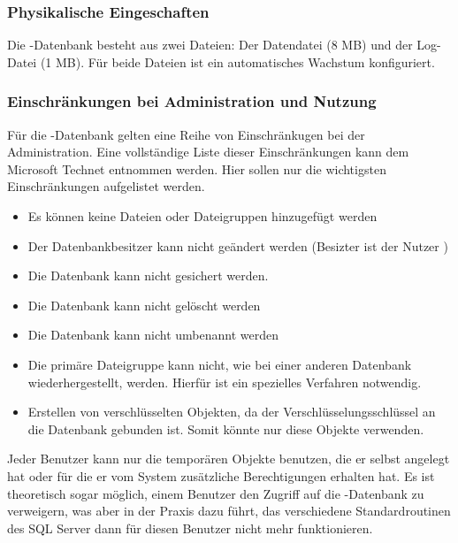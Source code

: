         \subsubsection{Physikalische Eingeschaften}
          Die -Datenbank besteht aus zwei Dateien: Der
          Datendatei  (8 MB) und der Log-Datei
           (1 MB). Für beide Dateien ist ein
          automatisches Wachstum konfiguriert.
        \subsubsection{Einschränkungen bei Administration und Nutzung}
          Für die -Datenbank gelten eine Reihe von
          Einschränkugen bei der Administration. Eine vollständige Liste dieser
          Einschränkungen kann dem Microsoft Technet entnommen werden. Hier
          sollen nur die wichtigsten Einschränkungen aufgelistet werden.
          \begin{itemize}
            \item Es können keine Dateien oder Dateigruppen hinzugefügt werden
            \item Der Datenbankbesitzer kann nicht geändert werden (Besizter
            ist der Nutzer )
            \item Die Datenbank kann nicht gesichert werden.
            \item Die Datenbank kann nicht gelöscht werden
            \item Die Datenbank kann nicht umbenannt werden
            \item Die primäre Dateigruppe kann nicht, wie bei einer anderen
            Datenbank wiederhergestellt, werden. Hierfür ist ein spezielles
            Verfahren notwendig.
            \item Erstellen von verschlüsselten Objekten, da der
            Verschlüsselungsschlüssel an die Datenbank gebunden ist. Somit
            könnte nur  diese Objekte verwenden.
          \end{itemize}
          Jeder Benutzer kann nur die temporären Objekte benutzen, die er selbst
          angelegt hat oder für die er vom System zusätzliche Berechtigungen
          erhalten hat. Es ist theoretisch sogar möglich, einem Benutzer den
          Zugriff auf die -Datenbank zu verweigern, was aber
          in der Praxis dazu führt, das verschiedene Standardroutinen des SQL
          Server dann für diesen Benutzer nicht mehr funktionieren.
          \begin{literaturinternet}
            \item \cite{ms190768}
          \end{literaturinternet}          
